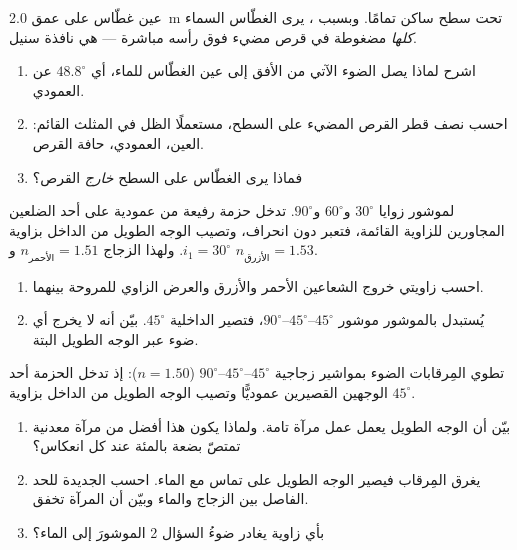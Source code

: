\begin{exercise}[$\star\star\star$]\label{exo:g10:refraction:12}
عين غطّاس على عمق \qty{2.0}{m} تحت سطح ساكن تمامًا. وبسبب
، يرى الغطّاس السماء \emph{كلها} مضغوطة في
قرص مضيء فوق رأسه مباشرة --- هي نافذة سنيل.
\begin{enumerate}
  \item اشرح لماذا يصل الضوء الآتي من الأفق إلى عين الغطّاس
         للماء، أي $48.8^\circ$ عن العمودي.
  \item احسب نصف قطر القرص المضيء على السطح، مستعملًا
        الظل في المثلث القائم: العين، العمودي، حافة القرص.
  \item فماذا يرى الغطّاس على السطح \emph{خارج} القرص؟
\end{enumerate}
\end{exercise}

\begin{exercise}[$\star\star\star$]\label{exo:g10:refraction:13}
لموشور زوايا $30^\circ$ و$60^\circ$ و$90^\circ$. تدخل حزمة رفيعة من
 عمودية على أحد الضلعين المجاورين للزاوية القائمة،
فتعبر دون انحراف، وتصيب الوجه الطويل من الداخل بزاوية
$i_1 = 30^\circ$. ولهذا الزجاج $n_{\text{الأحمر}} = 1.51$ و
$n_{\text{الأزرق}} = 1.53$.
\begin{enumerate}
  \item احسب زاويتي خروج الشعاعين الأحمر والأزرق والعرض
        الزاوي للمروحة بينهما.
  \item يُستبدل بالموشور موشور $45^\circ$--$45^\circ$--$90^\circ$،
        فتصير  الداخلية $45^\circ$.
        بيّن أنه لا يخرج أي ضوء عبر الوجه الطويل البتة.
\end{enumerate}
\end{exercise}

\begin{exercise}[$\star\star\star$]\label{exo:g10:refraction:14}
تطوي المِرقابات الضوء بمواشير زجاجية $45^\circ$--$45^\circ$--$90^\circ$
($n = 1.50$): إذ تدخل الحزمة أحد الوجهين القصيرين عموديًّا
وتصيب الوجه الطويل من الداخل بزاوية $45^\circ$.
\begin{enumerate}
  \item بيّن أن الوجه الطويل يعمل عمل مرآة تامة. ولماذا يكون هذا
        أفضل من مرآة معدنية تمتصّ بضعة بالمئة عند
        كل انعكاس؟
  \item يغرق المِرقاب فيصير الوجه الطويل على تماس مع
        الماء. احسب  الجديدة للحد الفاصل بين الزجاج والماء
        وبيّن أن المرآة تخفق.
  \item بأي زاوية يغادر ضوءُ السؤال 2 الموشورَ إلى
        الماء؟
\end{enumerate}
\end{exercise}

